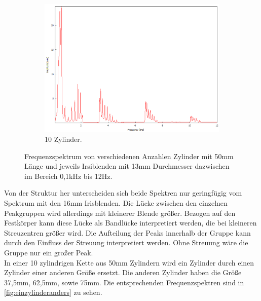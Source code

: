 \begin{figure}
\begin{subfigure}[b]{0.3\textwidth}
        \includegraphics[width=\textwidth]{data/4_2/13mm_10zylinder.png}
        \caption{10 Zylinder.}
    \end{subfigure}
    \hfill
    \caption{Frequenzspektrum von verschiedenen Anzahlen Zylinder mit 50\;mm Länge und jeweils Irsiblenden mit 13\;mm Durchmesser dazwischen im Bereich 0,1\;kHz bis 12\;Hz.}
    \label{fig:allesgleich13}
\end{figure}
Von der Struktur her unterscheiden sich beide Spektren nur geringfügig vom Spektrum mit den 
16\;mm Irisblenden. Die Lücke zwischen den einzelnen Peakgruppen wird allerdings mit kleinerer
Blende größer. Bezogen auf den Festkörper kann diese Lücke als Bandlücke interpretiert werden, 
die bei kleineren Streuzentren größer wird. Die Aufteilung der Peaks innerhalb der Gruppe kann 
durch den Einfluss der Streuung interpretiert werden. Ohne Streuung wäre die Gruppe nur ein großer Peak.\\
In einer 10 zylindrigen Kette aus 50\;mm Zylindern wird ein Zylinder durch einen Zylinder 
einer anderen Größe ersetzt. Die anderen Zylinder haben die Größe 37,5\;mm, 62,5\;mm, sowie 75\;mm.
Die entsprechenden Frequenzspektren sind in \autoref{fig:einzylinderanders} zu sehen.
